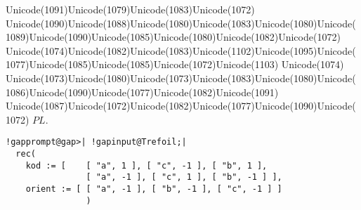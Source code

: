 \documentclass[a4paper,11pt]{report}
\begin{document}
{{Unicode(1091)Unicode(1079)Unicode(1083)Unicode(1072)
Unicode(1090)Unicode(1088)Unicode(1080)Unicode(1083)Unicode(1080)Unicode(1089)Unicode(1090)Unicode(1085)Unicode(1080)Unicode(1082)Unicode(1072)
Unicode(1074)Unicode(1082)Unicode(1083)Unicode(1102)Unicode(1095)Unicode(1077)Unicode(1085)Unicode(1085)Unicode(1072)Unicode(1103)
Unicode(1074)
Unicode(1073)Unicode(1080)Unicode(1073)Unicode(1083)Unicode(1080)Unicode(1086)Unicode(1090)Unicode(1077)Unicode(1082)Unicode(1091)
Unicode(1087)Unicode(1072)Unicode(1082)Unicode(1077)Unicode(1090)Unicode(1072) $PL.$ 
\begin{Verbatim}[commandchars=!@|,fontsize=\small,frame=single,label=Пример]
  !gapprompt@gap>| !gapinput@Trefoil;|
  rec(
  	kod := [ 	[ "a", 1 ], [ "c", -1 ], [ "b", 1 ],
  				[ "a", -1 ], [ "c", 1 ], [ "b", -1 ] ],
  	orient := [ [ "a", -1 ], [ "b", -1 ], [ "c", -1 ] ] 
  				)
    			

\end{Verbatim}}}
\end{document}
